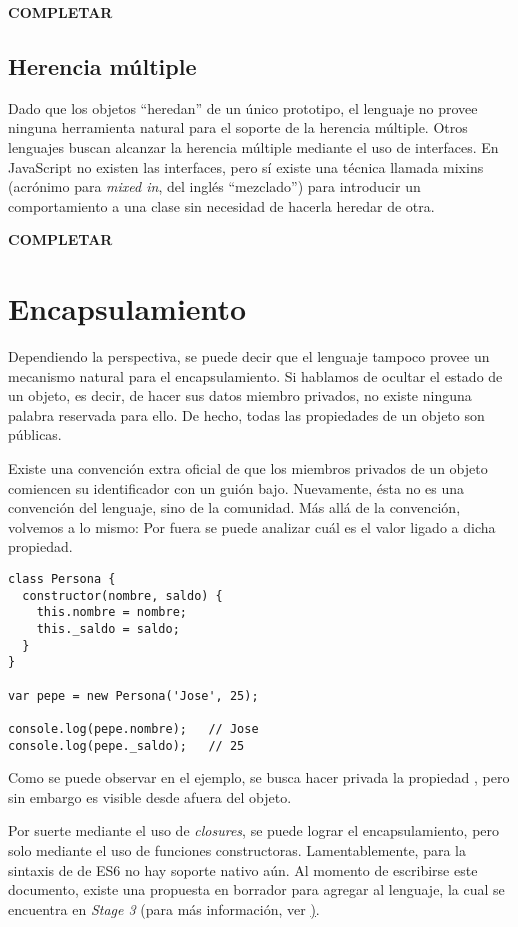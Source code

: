 \textbf{COMPLETAR}

\subsection{Herencia múltiple}

Dado que los objetos "`heredan"' de un único prototipo, el lenguaje no provee ninguna herramienta natural para el soporte de la herencia múltiple. Otros lenguajes buscan alcanzar la herencia múltiple mediante el uso de interfaces. En JavaScript no existen las interfaces, pero sí existe una técnica llamada mixins (acrónimo para \textit{mixed in}, del inglés "`mezclado"') para introducir un comportamiento a una clase sin necesidad de hacerla heredar de otra.

\textbf{COMPLETAR}

\section{Encapsulamiento}

Dependiendo la perspectiva, se puede decir que el lenguaje tampoco provee un mecanismo natural para el encapsulamiento. Si hablamos de ocultar el estado de un objeto, es decir, de hacer sus datos miembro privados, no existe ninguna palabra reservada para ello. De hecho, todas las propiedades de un objeto son públicas.

Existe una convención extra oficial de que los miembros privados de un objeto comiencen su identificador con un guión bajo. Nuevamente, ésta no es una convención del lenguaje, sino de la comunidad. Más allá de la convención, volvemos a lo mismo: Por fuera se puede analizar cuál es el valor ligado a dicha propiedad.

\begin{lstlisting}[title={Descubriendo variables "`privadas"'}]
class Persona {
  constructor(nombre, saldo) {
    this.nombre = nombre;
    this._saldo = saldo;
  }
}

var pepe = new Persona('Jose', 25);

console.log(pepe.nombre);	// Jose
console.log(pepe._saldo);	// 25
\end{lstlisting}

Como se puede observar en el ejemplo, se busca hacer privada la propiedad , pero sin embargo es visible desde afuera del objeto.

Por suerte mediante el uso de \textit{closures}, se puede lograr el encapsulamiento, pero solo mediante el uso de funciones constructoras. Lamentablemente, para la sintaxis de  de ES6 no hay soporte nativo aún. Al momento de escribirse este documento, existe una propuesta en borrador para agregar al lenguaje, la cual se encuentra en \textit{Stage 3} (para más información, ver \href{https://github.com/tc39/proposal-class-fields#private-fields}).

